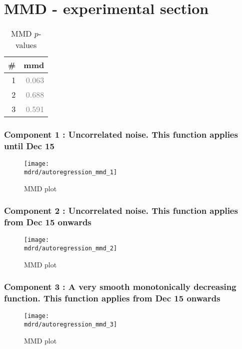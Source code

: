 \documentclass{article} %
\begin{document}
\section{MMD - experimental section}
\label{sec:mmd}

\begin{table}[htb]
\begin{center}
{\small
\begin{tabular}{|r|r|}
\hline
\bf{\#} & {mmd}\\
\hline

1 & \textcolor{gray}{0.063}\\

2 & \textcolor{gray}{0.688}\\

3 & \textcolor{gray}{0.591}\\

\hline
\end{tabular}
\caption{
MMD $p$-values
}
\label{table:mmd}
}
\end{center}
\end{table}

\subsubsection{Component 1 : Uncorrelated noise. This function applies until Dec   15}

\begin{figure}[H]
\newcommand{\wmgd}{0.5\columnwidth}
\newcommand{\hmgd}{3.0cm}
\newcommand{\mdrd}{autoregression}
\newcommand{\mbm}{\hspace{-0.3cm}}
\texttt{[image: \\mdrd/autoregression\_mmd\_1]}
\caption{
MMD plot}
\label{fig:mmd1}
\end{figure}

\subsubsection{Component 2 : Uncorrelated noise. This function applies from Dec   15 onwards}

\begin{figure}[H]
\newcommand{\wmgd}{0.5\columnwidth}
\newcommand{\hmgd}{3.0cm}
\newcommand{\mdrd}{autoregression}
\newcommand{\mbm}{\hspace{-0.3cm}}
\texttt{[image: \\mdrd/autoregression\_mmd\_2]}
\caption{
MMD plot}
\label{fig:mmd2}
\end{figure}

\subsubsection{Component 3 : A very smooth monotonically decreasing function. This function applies from Dec   15 onwards}

\begin{figure}[H]
\newcommand{\wmgd}{0.5\columnwidth}
\newcommand{\hmgd}{3.0cm}
\newcommand{\mdrd}{autoregression}
\newcommand{\mbm}{\hspace{-0.3cm}}
\texttt{[image: \\mdrd/autoregression\_mmd\_3]}
\caption{
MMD plot}
\label{fig:mmd3}
\end{figure}
\end{document}

